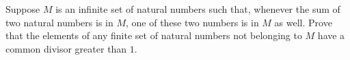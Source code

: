 Suppose $M$ is an infinite set of natural numbers such that, whenever the sum of two natural numbers is in $M$, one of these two numbers is in $M$ as well. Prove that the elements of any finite set of natural numbers not belonging to $M$ have a common divisor greater than $1$.